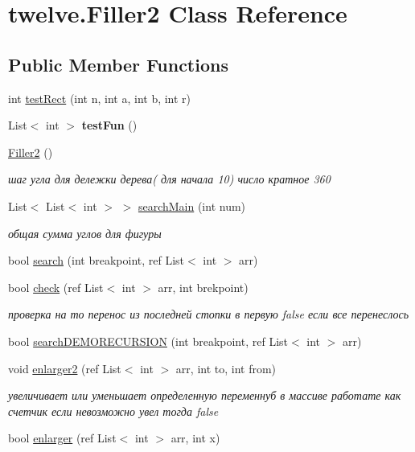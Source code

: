 \hypertarget{classtwelve_1_1_filler2}{}\section{twelve.\+Filler2 Class Reference}
\label{classtwelve_1_1_filler2}
\subsection*{Public Member Functions}
\begin{DoxyCompactItemize}
\item 
int \hyperlink{classtwelve_1_1_filler2_ad7dc51c22d12b0e10090b1802cbde9bf}{test\+Rect} (int n, int a, int b, int r)
\item 
\hypertarget{classtwelve_1_1_filler2_ab0858c8ddfd502279085fd0515fd97b5}{}List$<$ int $>$ {\bfseries test\+Fun} ()\label{classtwelve_1_1_filler2_ab0858c8ddfd502279085fd0515fd97b5}

\item 
\hyperlink{classtwelve_1_1_filler2_ac695bd950cff1cc72ab7fc3046f28803}{Filler2} ()
\begin{DoxyCompactList}\small\item\em шаг угла для дележки дерева( для начала 10) число кратное 360 \end{DoxyCompactList}\item 
List$<$ List$<$ int $>$ $>$ \hyperlink{classtwelve_1_1_filler2_a724652dc8868719471ec3f2e60a2bee9}{search\+Main} (int num)
\begin{DoxyCompactList}\small\item\em общая сумма углов для фигуры \end{DoxyCompactList}\item 
bool \hyperlink{classtwelve_1_1_filler2_a86df5048936960aa78ed2e572de1f696}{search} (int breakpoint, ref List$<$ int $>$ arr)
\item 
bool \hyperlink{classtwelve_1_1_filler2_a0aa64ee492904c6aed80d5be8c23de27}{check} (ref List$<$ int $>$ arr, int brekpoint)
\begin{DoxyCompactList}\small\item\em проверка на то перенос из последней стопки в первую false если все перенеслось \end{DoxyCompactList}\item 
bool \hyperlink{classtwelve_1_1_filler2_a2a0dbb1938fcc0150edec9fba4a865ca}{search\+D\+E\+M\+O\+R\+E\+C\+U\+R\+S\+I\+O\+N} (int breakpoint, ref List$<$ int $>$ arr)
\item 
void \hyperlink{classtwelve_1_1_filler2_a1bdbb0a7cdeb105e623833d64cdbb23e}{enlarger2} (ref List$<$ int $>$ arr, int to, int from)
\begin{DoxyCompactList}\small\item\em увеличивает или уменьшает определенную переменнуб в массиве работате как счетчик если невозможно увел тогда false \end{DoxyCompactList}\item 
bool \hyperlink{classtwelve_1_1_filler2_aa463aa40ca8c7bb512bee4bb6d55d86a}{enlarger} (ref List$<$ int $>$ arr, int x)
\end{DoxyCompactItemize}
